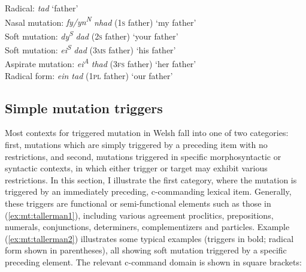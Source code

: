 \documentclass[output=paper,colorlinks,citecolor=brown]{langscibook}
\begin{document}
\ea\label{ex:mt:tallerman1}
Radical: \textit{tad} ‘father’\\
Nasal mutation: \textit{fy/yn\textsuperscript{N}} \textit{nhad} (\textsc{1s} father) ‘my father’\\
Soft mutation: \textit{dy\textsuperscript{S}} \textit{dad} (\textsc{2s} father) ‘your father’\\
Soft mutation: \textit{ei\textsuperscript{S}} \textit{dad} (\textsc{3ms} father) ‘his father’\\
Aspirate mutation: \textit{ei\textsuperscript{A}} \textit{thad} (\textsc{3fs} father) ‘her father’\\
Radical form: \textit{ein tad} (1\textsc{pl} father) ‘our father’
\z



\subsection{Simple mutation triggers}


Most contexts for triggered mutation in Welsh fall into one of two categories: first, mutations which are simply triggered by a preceding item with no restrictions, and second, mutations triggered in specific morphosyntactic or syntactic contexts, in which either trigger or target may exhibit various restrictions. In this section, I illustrate the first category, where the mutation is triggered by an immediately preceding, c-commanding lexical item. Generally, these triggers are functional or semi-functional elements such as those in (\ref{ex:mt:tallerman1}), including various agreement proclitics, prepositions, numerals, conjunctions, determiners, complementizers and particles. Example (\ref{ex:mt:tallerman2}) illustrates some typical examples (triggers in bold; radical form shown in parentheses), all showing soft mutation triggered by a specific preceding element. The relevant c-command domain is shown in square brackets: 
\end{document}
